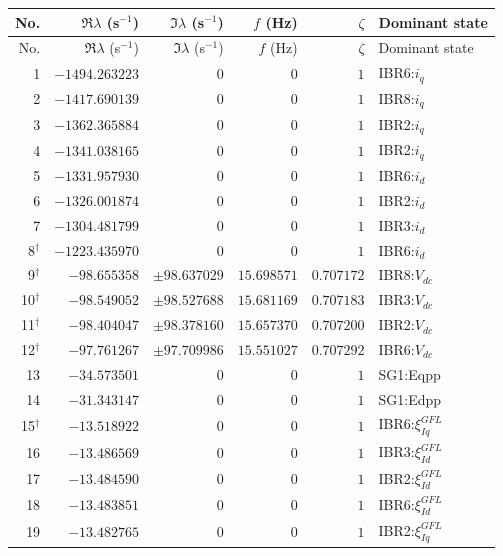 \begingroup\footnotesize\setlength{\tabcolsep}{3pt}
\begin{longtable}{@{}r r r r r l@{}}
\toprule
No. & $\Re\lambda$ (s$^{-1}$) & $\Im\lambda$ (s$^{-1}$) & $f$ (Hz) & $\zeta$ & Dominant state \\ \midrule
\endfirsthead
\toprule
No. & $\Re\lambda$ (s$^{-1}$) & $\Im\lambda$ (s$^{-1}$) & $f$ (Hz) & $\zeta$ & Dominant state \\ \midrule
\endhead
1 & $-1494.263223$ & $0$ & $0$ & $1$ & IBR6:$i_q$ \\ 
2 & $-1417.690139$ & $0$ & $0$ & $1$ & IBR8:$i_q$ \\ 
3 & $-1362.365884$ & $0$ & $0$ & $1$ & IBR2:$i_q$ \\ 
4 & $-1341.038165$ & $0$ & $0$ & $1$ & IBR2:$i_q$ \\ 
5 & $-1331.957930$ & $0$ & $0$ & $1$ & IBR6:$i_d$ \\ 
6 & $-1326.001874$ & $0$ & $0$ & $1$ & IBR2:$i_d$ \\ 
7 & $-1304.481799$ & $0$ & $0$ & $1$ & IBR3:$i_d$ \\ 
8$^{\dagger}$ & $-1223.435970$ & $0$ & $0$ & $1$ & IBR6:$i_d$ \\ 
9$^{\dagger}$ & $-98.655358$ & $\pm98.637029$ & $15.698571$ & $0.707172$ & IBR8:$V_{dc}$ \\ 
10$^{\dagger}$ & $-98.549052$ & $\pm98.527688$ & $15.681169$ & $0.707183$ & IBR3:$V_{dc}$ \\ 
11$^{\dagger}$ & $-98.404047$ & $\pm98.378160$ & $15.657370$ & $0.707200$ & IBR2:$V_{dc}$ \\ 
12$^{\dagger}$ & $-97.761267$ & $\pm97.709986$ & $15.551027$ & $0.707292$ & IBR6:$V_{dc}$ \\ 
13 & $-34.573501$ & $0$ & $0$ & $1$ & SG1:Eqpp \\ 
14 & $-31.343147$ & $0$ & $0$ & $1$ & SG1:Edpp \\ 
15$^{\dagger}$ & $-13.518922$ & $0$ & $0$ & $1$ & IBR6:$\xi_{Iq}^{GFL}$ \\ 
16 & $-13.486569$ & $0$ & $0$ & $1$ & IBR3:$\xi_{Id}^{GFL}$ \\ 
17 & $-13.484590$ & $0$ & $0$ & $1$ & IBR2:$\xi_{Id}^{GFL}$ \\ 
18 & $-13.483851$ & $0$ & $0$ & $1$ & IBR6:$\xi_{Id}^{GFL}$ \\ 
19 & $-13.482765$ & $0$ & $0$ & $1$ & IBR2:$\xi_{Iq}^{GFL}$ \\ 

\end{longtable}
